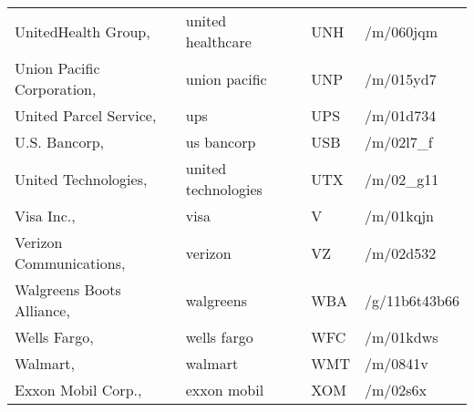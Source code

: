 \begin{longtable}[c]{llll}
UnitedHealth Group, & united healthcare & UNH & /m/060jqm \\
Union Pacific Corporation, & union pacific & UNP & /m/015yd7 \\
United Parcel Service, & ups & UPS & /m/01d734 \\
U.S. Bancorp, & us bancorp & USB & /m/02l7\_f \\
United Technologies, & united technologies & UTX & /m/02\_g11 \\
Visa Inc., & visa & V & /m/01kqjn \\
Verizon Communications, & verizon & VZ & /m/02d532 \\
Walgreens Boots Alliance, & walgreens & WBA & /g/11b6t43b66 \\
Wells Fargo, & wells fargo & WFC & /m/01kdws \\
Walmart, & walmart & WMT & /m/0841v \\
Exxon Mobil Corp., & exxon mobil & XOM & /m/02s6x
\end{longtable}
